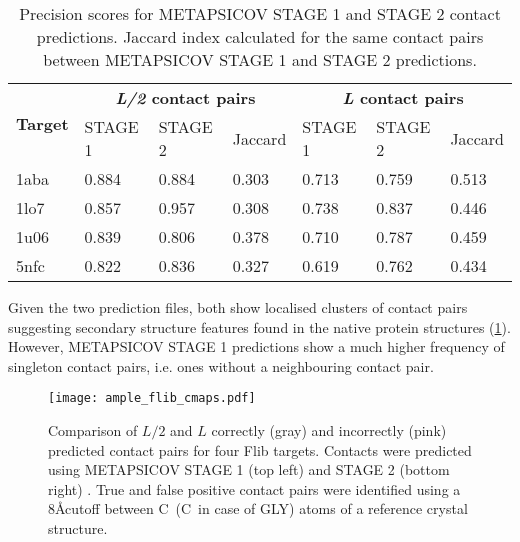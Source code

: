 \begin{table}[H]
  \centering
  \caption[Contact prediction summary for Flib targets]{Precision scores for METAPSICOV \cite{Jones2015-wp} STAGE 1 and STAGE 2 contact predictions. Jaccard index calculated for the same contact pairs between METAPSICOV STAGE 1 and STAGE 2 predictions.}
  \label{table:ample_flib_contact_precision}
  \begin{tabularx}{\textwidth}{X X X X X X X}
      \hline
	  \multirow{2}{*}{\textbf{Target}} & \multicolumn{3}{c}{\textbf{\textit{L/2} contact pairs}} & \multicolumn{3}{c}{\textbf{\textit{L} contact pairs}} 	\\ \cline{2-7}
	  							&  	STAGE 1	& 	STAGE 2	& 	Jaccard 	& 	STAGE 1 	& 	STAGE 2 	& 	Jaccard	 	\\
	  \hline
	  1aba						&	0.884	&	0.884	&	0.303	&	0.713	&	0.759	&	0.513		\\
	  1lo7						&	0.857	&	0.957	&	0.308	&	0.738	&	0.837	&	0.446		\\
	  1u06						&	0.839	&	0.806	&	0.378	&	0.710	&	0.787	&	0.459		\\
	  5nfc						&	0.822	&	0.836	&	0.327	&	0.619	&	0.762	&	0.434		\\ 
	  \hline
  \end{tabularx}
\end{table}

Given the two prediction files, both show localised clusters of contact pairs suggesting
 secondary structure features found in the native protein structures (\cref{fig:ample_flib_cmaps}). However, METAPSICOV STAGE 1 predictions show a much higher frequency of singleton contact pairs, i.e. ones without a neighbouring contact pair.

\begin{figure}[H]
	\centering
	\texttt{[image: ample\_flib\_cmaps.pdf]}
	\caption[Contact map comparison for Flib targets]{Comparison of $L/2$ and $L$ correctly (gray) and incorrectly (pink) predicted contact pairs for four Flib targets. Contacts were predicted using METAPSICOV STAGE 1 (top left) and STAGE 2 (bottom right) \cite{Jones2015-wp}. True and false positive contact pairs were identified using a 8\AA cutoff between C\textalpha\ (C\textbeta\ in case of GLY) atoms of a reference crystal structure.}
	\label{fig:ample_flib_cmaps}
\end{figure}

